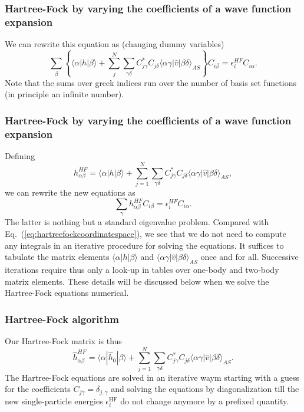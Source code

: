 \documentclass{beamer}
\begin{document}
\begin{frame}
\frametitle{Hartree-Fock by varying the coefficients of a wave function expansion}

\begin{block}{}
We can rewrite this equation as (changing dummy variables)
\[
\sum_{\beta} \left\{\langle \alpha | h | \beta \rangle+
\sum_{j}^N\sum_{\gamma\delta} C^*_{j\gamma}C_{j\delta}\langle \alpha\gamma|\hat{v}|\beta\delta\rangle_{AS}\right\}C_{i\beta}=\epsilon_i^{HF}C_{i\alpha}.
\]
Note that the sums over greek indices run over the number of basis set functions (in principle an infinite number).
\end{block}
\end{frame}

\begin{frame}
\frametitle{Hartree-Fock by varying the coefficients of a wave function expansion}

\begin{block}{}
Defining 
\[
h_{\alpha\beta}^{HF}=\langle \alpha | h | \beta \rangle+
\sum_{j=1}^N\sum_{\gamma\delta} C^*_{j\gamma}C_{j\delta}\langle \alpha\gamma|\hat{v}|\beta\delta\rangle_{AS},
\]
we can rewrite the new equations as 
\begin{equation}
\sum_{\gamma}h_{\alpha\beta}^{HF}C_{i\beta}=\epsilon_i^{HF}C_{i\alpha}. \label{eq:newhf}
\end{equation}
The latter is nothing but a standard eigenvalue problem. Compared with Eq.~(\ref{eq:hartreefockcoordinatespace}),
we see that we do not need to compute any integrals in an iterative procedure for solving the equations.
It suffices to tabulate the matrix elements $\langle \alpha | h | \beta \rangle$ and $\langle \alpha\gamma|\hat{v}|\beta\delta\rangle_{AS}$ once and for all. Successive iterations require thus only a look-up in tables over one-body and two-body matrix elements. These details will be discussed below when we solve the Hartree-Fock equations numerical. 
\end{block}
\end{frame}

\begin{frame}
\frametitle{Hartree-Fock algorithm}

\begin{block}{}
Our Hartree-Fock matrix  is thus
\[
\hat{h}_{\alpha\beta}^{HF}=\langle \alpha | \hat{h}_0 | \beta \rangle+
\sum_{j=1}^N\sum_{\gamma\delta} C^*_{j\gamma}C_{j\delta}\langle \alpha\gamma|\hat{v}|\beta\delta\rangle_{AS}.
\]
The Hartree-Fock equations are solved in an iterative waym starting with a guess for the coefficients $C_{j\gamma}=\delta_{j,\gamma}$ and solving the equations by diagonalization till the new single-particle energies
$\epsilon_i^{\mathrm{HF}}$ do not change anymore by a prefixed quantity. 
\end{block}
\end{frame}
\end{document}
